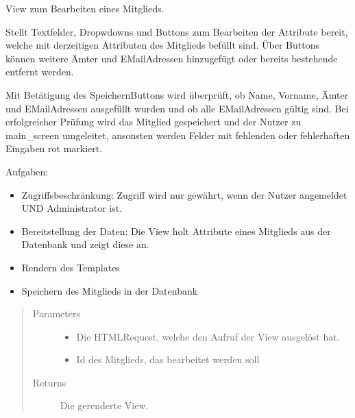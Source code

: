 \documentclass[letterpaper,10pt,english]{sphinxmanual}
\begin{document}
\begin{fulllineitems}
\label{\detokenize{masterCodeDoc:mitglieder.views.mitgliedBearbeitenView}}
View zum Bearbeiten eines Mitglieds.

Stellt Textfelder, Dropwdowns und Buttons zum Bearbeiten der Attribute bereit, welche mit derzeitigen Attributen des Mitglieds befüllt sind. Über Buttons können weitere Ämter und E\sphinxhyphen{}Mail\sphinxhyphen{}Adressen hinzugefügt oder bereits bestehende entfernt werden.

Mit Betätigung des Speichern\sphinxhyphen{}Buttons wird überprüft, ob Name, Vorname, Ämter und E\sphinxhyphen{}Mail\sphinxhyphen{}Adressen ausgefüllt wurden und ob alle E\sphinxhyphen{}Mail\sphinxhyphen{}Adressen gültig sind. Bei erfolgreicher Prüfung wird das Mitglied gespeichert und der
Nutzer zu main\_screen umgeleitet, ansonsten werden Felder mit fehlenden oder fehlerhaften Eingaben rot markiert.

Aufgaben:
\begin{itemize}
\item {} 
Zugriffsbeschränkung: Zugriff wird nur gewährt, wenn der Nutzer angemeldet UND Administrator ist.

\item {} 
Bereitstellung der Daten: Die View holt Attribute eines Mitglieds aus der Datenbank und zeigt diese an.

\item {} 
Rendern des Templates

\item {} 
Speichern des Mitglieds in der Datenbank

\end{itemize}
\begin{quote}\begin{description}
\item[{Parameters}] \leavevmode\begin{itemize}
\item {} 
 \textendash{} Die HTML\sphinxhyphen{}Request, welche den Aufruf der View ausgelöst hat.

\item {} 
 \textendash{} Id des Mitglieds, das bearbeitet werden soll

\end{itemize}

\item[{Returns}] \leavevmode
Die gerenderte View.

\end{description}\end{quote}

\end{fulllineitems}
\end{document}
